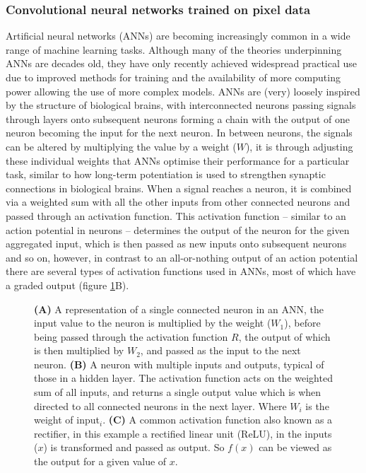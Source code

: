 \documentclass[a4paper,11pt,twoside,openright]{scrbook}
\begin{document}
\subsubsection{Convolutional neural networks trained on pixel data}
Artificial neural networks (ANNs) are becoming increasingly common in a wide range of machine learning tasks.
Although many of the theories underpinning ANNs are decades old, \cite{Rosenblatt1958} they have only recently achieved widespread practical use due to improved methods for training \cite{Rumelhart1986} and the availability of more computing power allowing the use of more complex models.
ANNs are (very) loosely inspired by the structure of biological brains, with interconnected neurons passing signals through layers onto subsequent neurons forming a chain with the output of one neuron becoming the input for the next neuron.
In between neurons, the signals can be altered by multiplying the value by a weight ($W$), it is through adjusting these individual weights that ANNs optimise their performance for a particular task, similar to how long-term potentiation is used to strengthen synaptic connections in biological brains.
When a signal reaches a neuron, it is combined via a weighted sum with all the other inputs from other connected neurons and passed through an activation function.
This activation function -- similar to an action potential in neurons -- determines the output of the neuron for the given aggregated input, which is then passed as new inputs onto subsequent neurons and so on, however, in contrast to an all-or-nothing output of an action potential there are several types of activation functions used in ANNs, most of which have a graded output (figure \ref{figure:neuron_relu}B).

\begin{figure}
    \captionsetup{width=0.9\textwidth}
    \caption[Diagram neural network neuron and activation function.]{\textbf{(A)} A representation of a single connected neuron in an ANN, the input value to the neuron is multiplied by the weight ($W_1$), before being passed through the activation function $R$, the output of which is then multiplied by $W_2$, and passed as the input to the next neuron. \textbf{(B)} A neuron with multiple inputs and outputs, typical of those in a hidden layer. The activation function acts on the weighted sum of all inputs, and returns a single output value which is when directed to all connected neurons in the next layer. Where $W_i$ is the weight of \textsf{input}$_i$. \textbf{(C)} A common activation function also known as a rectifier, in this example a rectified linear unit (ReLU), in the inputs ($x$) is transformed and passed as output. So $f(x)$ can be viewed as the output for a given value of $x$.}
    \label{figure:neuron_relu}

\end{figure}
\end{document}
